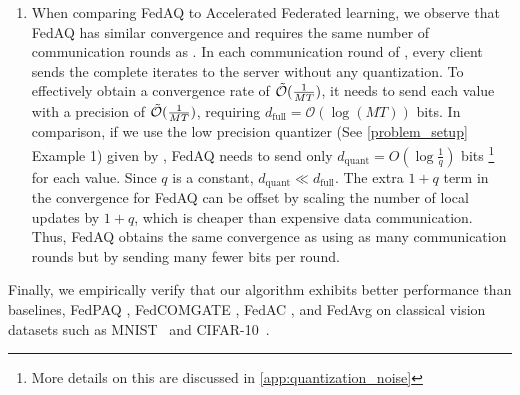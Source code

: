 \begin{enumerate}
    \item \label{contribution2} When comparing FedAQ to Accelerated Federated learning, we observe that FedAQ has similar convergence and requires the same number of communication rounds as \cite{yuan2020federated}. In each communication round of \cite{yuan2020federated}, every client sends the complete iterates to the server without any quantization. To effectively obtain a convergence rate of $\Tilde{\mathcal{O}}(\frac{1}{MT})$, it needs to send each value with a precision of $\Tilde{\mathcal{O}}(\frac{1}{MT})$, requiring $d_{\text{full}} = {\mathcal{O}}(\log{(MT)})$ bits. In comparison, if we use the low precision quantizer (See \cref{problem_setup} Example 1) given by \cite{alistarh2017qsgd}, FedAQ needs to send only $d_{\text{quant}} = O(\log \frac{1}{q})$ bits \footnote{More details on this are discussed in \cref{app:quantization_noise}} for each value. Since $q$ is a constant, $d_{\text{quant}} \ll d_{\text{full}}$. The extra $1+q$ term in the convergence for FedAQ can be offset by scaling the number of local updates by $1+q$, which is cheaper than expensive data communication. Thus, FedAQ obtains the same convergence as \cite{yuan2020federated} using as many communication rounds but by sending many fewer bits per round.


 \end{enumerate}

 Finally, we empirically verify that our algorithm exhibits better performance than baselines, FedPAQ \cite{reisizadeh2020fedpaq}, FedCOMGATE \cite{haddadpour2021federated}, FedAC \cite{yuan2020federated}, and FedAvg \cite{mcmahan2017communication} on classical vision datasets such as MNIST~\cite{lecun1998mnist} and CIFAR-10~\cite{krizhevsky2009learning}. 